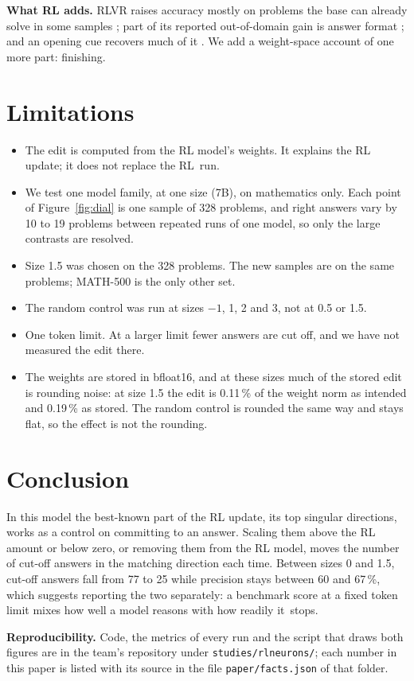 \documentclass[10pt]{article}
\begin{document}
\textbf{What RL adds.} RLVR
raises accuracy mostly on problems the base can already solve in some samples
\cite{yue2025does,kim2025reinforcement}; part of its reported out-of-domain gain is answer format
\cite{lyu2026same}; and an opening cue recovers much of it \cite{wang2026base}. We add a weight-space account of
one more part: finishing.

\section{Limitations}

\begin{itemize}
\item The edit is computed from the RL model's weights. It explains the RL update; it does not replace the RL~run.
\item We test one model family, at one size (7B), on mathematics only. Each point of Figure~\ref{fig:dial} is one
sample of 328 problems, and right answers vary by 10 to 19 problems between repeated runs of one model, so only the
large contrasts are resolved.
\item Size 1.5 was chosen on the 328 problems. The new samples are on the same problems; MATH-500 is the only other set.
\item The random control was run at sizes $-1$, 1, 2 and 3, not at 0.5 or 1.5.
\item One token limit. At a larger limit fewer answers are cut off, and we have not measured the edit there.
\item The weights are stored in bfloat16, and at these sizes much of the stored edit is rounding noise: at size
1.5 the edit is 0.11\,\% of the weight norm as intended and 0.19\,\% as stored. The random control is rounded the
same way and stays flat, so the effect is not the rounding.
\end{itemize}

\section{Conclusion}

In this model the best-known part of the RL update, its top singular directions, works as a control on committing
to an answer. Scaling them above the RL amount or below zero, or removing them from the RL model, moves the number
of cut-off answers in the matching direction each time. Between sizes 0 and 1.5, cut-off answers fall from 77 to 25
while precision stays between 60 and 67\,\%, which suggests reporting the two separately: a benchmark score at a
fixed token limit mixes how well a model reasons with how readily it~stops.

{\small
\textbf{Reproducibility.} Code, the metrics of every run and the script that draws both figures are in the team's
repository under \texttt{studies/rlneurons/}; each number in this paper
is listed with its source in the file \texttt{paper/facts.json} of that folder.
}

{\footnotesize


}
\end{document}
